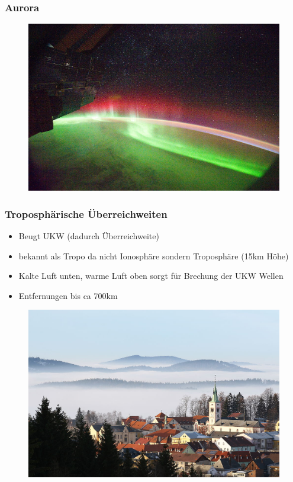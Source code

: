 \begin{frame}
    \frametitle{Aurora}
	\begin{center}
        \begin{figure}
      \includegraphics[width=.9\textwidth,height=.75\textheight,keepaspectratio]{e09/Aurora_Seen_From_Space_by_NASA.jpg}
    \end{figure}
    \end{center}
\end{frame}

\begin{frame}
    \frametitle{Troposphärische Überreichweiten}
    \begin{itemize}
      \item Beugt UKW (dadurch Überreichweite)
      \item bekannt als Tropo da nicht Ionosphäre sondern Troposphäre (15km Höhe)
      \item Kalte Luft unten, warme Luft oben sorgt für Brechung der UKW Wellen
      \item Entfernungen bis ca 700km
    \end{itemize}
    	\begin{center}
        \begin{figure}
      \includegraphics[width=.65\textwidth,height=.5\textheight,keepaspectratio]{e09/tropo.jpg}
    \end{figure}
    \end{center}
\end{frame}

